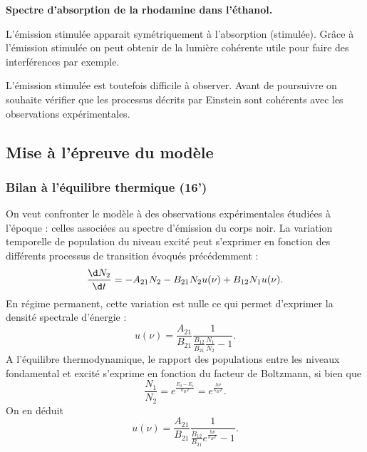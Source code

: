 \begin{experience}
\textbf{Spectre d'absorption de la rhodamine dans l'éthanol.}
\end{experience}

L'émission stimulée apparait symétriquement à l'absorption (stimulée).
Grâce à l'émission stimulée on peut obtenir de la lumière cohérente utile pour faire des interférences par exemple.

\begin{transition}
L'émission stimulée est toutefois difficile à observer.
Avant de poursuivre on souhaite vérifier que les processus décrits par Einstein sont cohérents avec les observations expérimentales.
\end{transition}

\subsection{Mise à l'épreuve du modèle}

\subsubsection{Bilan à l'équilibre thermique (16')}

On veut confronter le modèle à des observations expérimentales étudiées à l'époque : celles associées au spectre d'émission du corps noir.
La variation temporelle de population du niveau excité peut s'exprimer en fonction des différents processus de transition évoqués précédemment :
\begin{equation}
\frac{\d N_2}{\d t} = -A_{21} N_2 - B_{21} N_2 u(\nu) + B_{12} N_1 u(\nu).
\end{equation}
En régime permanent, cette variation est nulle ce qui permet d'exprimer la densité spectrale d'énergie :
\begin{equation}
u(\nu) = \frac{A_{21}}{B_{21}}\frac{1}{\frac{B_{12}}{B_{21}}\frac{N_1}{N_2} - 1}.
\end{equation}
A l'équilibre thermodynamique, le rapport des populations entre les niveaux fondamental et excité s'exprime en fonction du facteur de Boltzmann, si bien que
\begin{equation}
\frac{N_1}{N_2} = e^{\frac{E_2-E_1}{k_B T}} = e^{\frac{h\nu}{k_B T}}.
\end{equation}
On en déduit
\begin{equation}
u(\nu) = \frac{A_{21}}{B_{21}} \frac{1}{\frac{B_{12}}{B_{21}} e^{\frac{h\nu}{k_B T}} - 1}.
\end{equation}

